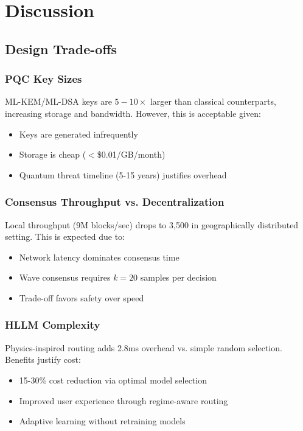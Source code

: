 \section{Discussion}


\subsection{Design Trade-offs}

\subsubsection{PQC Key Sizes}

ML-KEM/ML-DSA keys are $5-10\times$ larger than classical counterparts, increasing storage and bandwidth. However, this is acceptable given:
\begin{itemize}
\item Keys are generated infrequently
\item Storage is cheap ($<$\$0.01/GB/month)
\item Quantum threat timeline (5-15 years) justifies overhead
\end{itemize}

\subsubsection{Consensus Throughput vs. Decentralization}

Local throughput (9M blocks/sec) drops to 3,500 in geographically distributed setting. This is expected due to:
\begin{itemize}
\item Network latency dominates consensus time
\item Wave consensus requires $k=20$ samples per decision
\item Trade-off favors safety over speed
\end{itemize}

\subsubsection{HLLM Complexity}

Physics-inspired routing adds 2.8ms overhead vs. simple random selection. Benefits justify cost:
\begin{itemize}
\item 15-30\% cost reduction via optimal model selection
\item Improved user experience through regime-aware routing
\item Adaptive learning without retraining models
\end{itemize}

